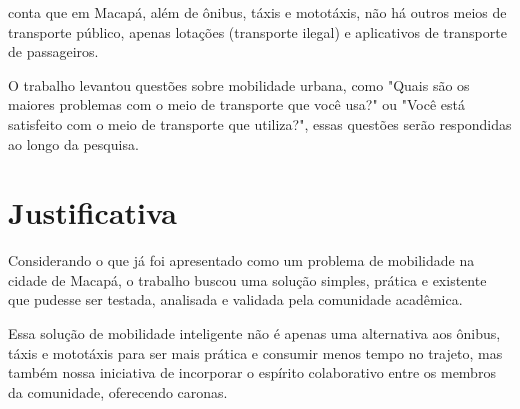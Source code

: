  conta que em Macapá, além de ônibus, táxis e mototáxis, não há outros meios de transporte público, apenas lotações (transporte ilegal) e aplicativos de transporte de passageiros.

O trabalho levantou questões sobre mobilidade urbana, como "Quais são os maiores problemas com o meio de transporte que você usa?" ou "Você está satisfeito com o meio de transporte que utiliza?", essas questões serão respondidas ao longo da pesquisa.






\section{Justificativa}



Considerando o que já foi apresentado como um problema de mobilidade na cidade de Macapá, o trabalho buscou uma solução simples, prática e existente que pudesse ser testada, analisada e validada pela comunidade acadêmica.


Essa solução de mobilidade inteligente não é apenas uma alternativa aos ônibus, táxis e mototáxis para ser mais prática e consumir menos tempo no trajeto, mas também nossa iniciativa de incorporar o espírito colaborativo entre os membros da comunidade, oferecendo caronas.




